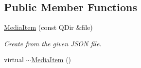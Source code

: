 \subsection*{Public Member Functions}
\begin{DoxyCompactItemize}
\item 
\hyperlink{class_a_w_e_1_1_media_item_a8cb8aeb690c2833d5bc175d40a1f7fe6}{Media\-Item} (const Q\-Dir \&file)
\begin{DoxyCompactList}\small\item\em Create from the given J\-S\-O\-N file. \end{DoxyCompactList}\item 
\hypertarget{class_a_w_e_1_1_media_item_a6999ea20d13e6fcd55b2d4104ca15b78}{virtual \hyperlink{class_a_w_e_1_1_media_item_a6999ea20d13e6fcd55b2d4104ca15b78}{$\sim$\-Media\-Item} ()}\label{class_a_w_e_1_1_media_item_a6999ea20d13e6fcd55b2d4104ca15b78}


\end{DoxyCompactItemize}
